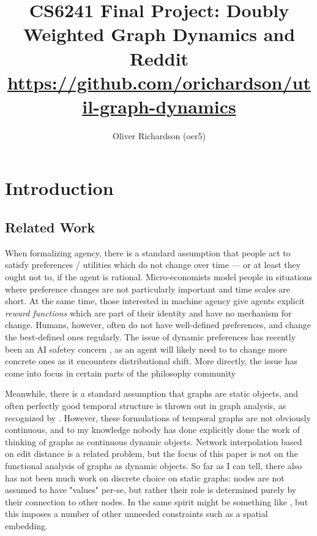 \documentclass{article}
\author{Oliver Richardson (oer5)}
\title{CS6241 Final Project: Doubly Weighted Graph Dynamics and Reddit\\[0.3em]
	\normalsize \url{https://github.com/orichardson/util-graph-dynamics}}
\date{}
\theoremstyle{definition}
\begin{document}
	\maketitle
	
	\section{Introduction}

	
	\subsection{Related Work}
	When formalizing agency, there is a standard assumption that people act to satisfy preferences / utilities which do not change over time --- or at least they ought not to, if the agent is rational. Micro-economists model people in situations where preference changes are not particularly important and time scales are short. At the same time, those interested in machine agency give agents explicit \textit{reward functions} which are part of their identity and have no mechanism for change. 	Humans, however, often do not have well-defined preferences, and change the best-defined ones regularly. 
	The issue of dynamic preferences has recently been an AI safetey concern \cite{amodei2016concrete}, as an agent will likely need to to change more concrete ones as it encounters distributional shift. More directly, the issue has come into focus in certain parts of the philosophy community \cite{grune2009preference}
	
	Meanwhile, there is a standard assumption that graphs are static objects, and often perfectly good temporal structure is thrown out in graph analysis, as recognized by \cite{kostakos2009temporal}\cite{bramsen2006inducing}. However, these formulations of temporal graphs are not obviously continuous, and to my knowledge nobody has done explicitly done the work of thinking of graphs as continuous dynamic objects. Network interpolation based on edit distance \cite{benson19netinterp} is a related problem, but the focus of this paper is not on the functional analysis of graphs as dynamic objects. So far as I can tell, there also has not been much work on discrete choice on static graphs: nodes are not assumed to have "values" per-se, but rather their role is determined purely by their connection to other nodes. In the same spirit might be something like \cite{dugundji2005discrete}, but this imposes a number of other unneeded constraints such as a spatial embedding.
	
\end{document}
